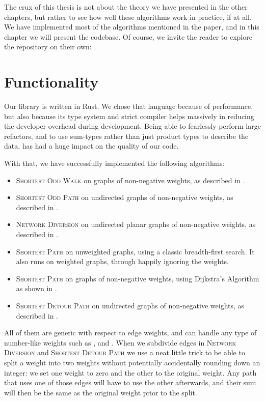 The crux of this thesis is not about the theory we have presented in the other chapters, but rather to see how well these algorithms work in practice, if at all. We have implemented most of the algorithms mentioned in the paper, and in this chapter we will present the codebase. Of course, we invite the reader to explore the repository on their own: \cite{source:codebase}.

\section{Functionality}
Our library is written in Rust. We chose that language because of performance, but also because its type system and strict compiler helps massively in reducing the developer overhead during development. Being able to fearlessly perform large refactors, and to use sum-types rather than just product types to describe the data, has had a huge impact on the quality of our code.

With that, we have successfully implemented the following algorithms:

\begin{itemize}
    \item \textsc{Shortest Odd Walk} on graphs of non-negative weights, as described in .
    \item \textsc{Shortest Odd Path} on undirected graphs of non-negative weights, as described in .
    \item \textsc{Network Diversion} on undirected planar graphs of non-negative weights, as described in .
    \item \textsc{Shortest Path} on unweighted graphs, using a classic breadth-first search. It also runs on weighted graphs, through happily ignoring the weights.
    \item \textsc{Shortest Path} on graphs of non-negative weights, using Dijkstra's Algorithm as shown in .
    \item \textsc{Shortest Detour Path} on undirected graphs of non-negative weights, as described in .
\end{itemize}

All of them are generic with respect to edge weights, and can handle any type of number-like weights such as ,  and . When we subdivide edges in \textsc{Network Diversion} and \textsc{Shortest Detour Path} we use a neat little trick to be able to split a weight into two weights without potentially accidentally rounding down an integer: we set one weight to zero and the other to the original weight. Any path that uses one of those edges will have to use the other afterwards, and their sum will then be the same as the original weight prior to the split.
